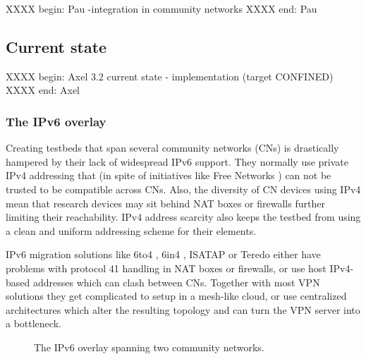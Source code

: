 \documentclass[conference]{IEEEtran}
\begin{document}
XXXX begin: Pau
-integration in community networks
XXXX end: Pau

\subsection{Current state}

XXXX begin: Axel
3.2 current state
- implementation (target CONFINED)
XXXX end: Axel

\subsubsection{The IPv6 overlay}

Creating testbeds that span several community networks (CNs) is drastically
hampered by their lack of widespread IPv6 support.  They normally use private
IPv4 addressing that (in spite of initiatives like Free Networks
\cite{free-networks}) can not be trusted to be compatible across CNs.  Also,
the diversity of CN devices using IPv4 mean that research devices may sit
behind NAT boxes or firewalls further limiting their reachability.  IPv4
address scarcity also keeps the testbed from using a clean and uniform
addressing scheme for their elements.


IPv6 migration solutions like 6to4 \cite{6to4}, 6in4 \cite{6in4}, ISATAP
\cite{isatap} or Teredo \cite{teredo} either have problems with protocol 41
handling in NAT boxes or firewalls, or use host IPv4-based addresses which can
clash between CNs.  Together with most VPN solutions they get complicated to
setup in a mesh-like cloud, or use centralized architectures which alter the
resulting topology and can turn the VPN server into a bottleneck.


\begin{figure}[!t]
\centering
\caption{The IPv6 overlay spanning two community networks.}
\label{fig:ipv6-overlay}
\end{figure}
\end{document}
